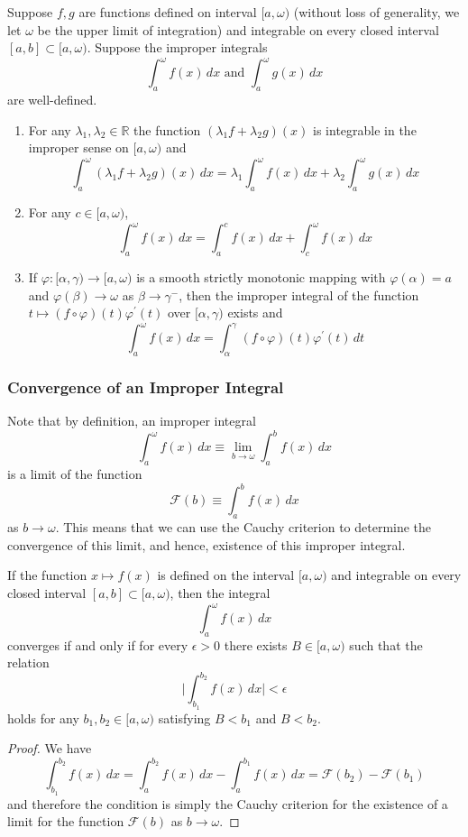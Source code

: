   \begin{lemma}
    Suppose $f, g$ are functions defined on interval $[a, \omega)$ (without loss of generality, we let $\omega$ be the upper limit of integration) and integrable on every closed interval $[a, b] \subset [a, \omega)$. Suppose the improper integrals 
    \[\int_a^\omega f(x)\,dx \text{ and } \int_a^\omega g(x)\,dx\]
    are well-defined. 
    \begin{enumerate}
      \item For any $\lambda_1, \lambda_2 \in \mathbb{R}$ the function $(\lambda_1 f + \lambda_2 g)(x)$ is integrable in the improper sense on $[a, \omega)$ and
      \[\int_a^\omega (\lambda_1 f + \lambda_2 g)(x)\,dx = \lambda_1 \int_a^\omega f(x)\,dx + \lambda_2 \int_a^\omega g(x)\,dx\]
      \item For any $c \in [a, \omega)$, 
      \[\int_a^\omega f(x)\,dx = \int_a^c f(x)\,dx + \int_c^\omega f(x)\,dx\]
      \item If $\varphi: [\alpha, \gamma) \longrightarrow [a, \omega)$ is a smooth strictly monotonic mapping with $\varphi(\alpha) = a$ and $\varphi(\beta) \rightarrow \omega$ as $\beta \rightarrow \gamma^-$, then the improper integral of the function $t \mapsto (f \circ \varphi)(t) \varphi^\prime (t)$ over $[\alpha, \gamma)$ exists and 
      \[\int_a^\omega f(x)\,dx = \int_\alpha^\gamma (f \circ \varphi)(t) \varphi^\prime (t)\,dt\]
    \end{enumerate}
  \end{lemma}

  \subsubsection{Convergence of an Improper Integral}

    Note that by definition, an improper integral 
    \[\int_a^\omega f(x)\,dx \equiv \lim_{b \rightarrow \omega} \int_a^b f(x) \,dx\]
    is a limit of the function 
    \[\mathcal{F}(b) \equiv \int_a^b f(x)\,dx\]
    as $b \rightarrow \omega$. This means that we can use the Cauchy criterion to determine the convergence of this limit, and hence, existence of this improper integral. 

    \begin{theorem}
    If the function $x \mapsto f(x)$ is defined on the interval $[a, \omega)$ and integrable on every closed interval $[a, b] \subset [a, \omega)$, then the integral 
    \[\int_a^\omega f(x)\,dx\]
    converges if and only if for every $\epsilon > 0$ there exists $B \in [a, \omega)$ such that the relation
    \[\Bigg| \int_{b_1}^{b_2} f(x)\,dx \bigg| < \epsilon\]
    holds for any $b_1, b_2 \in [a, \omega)$ satisfying $B < b_1$ and $B < b_2$. 
    \end{theorem}
    \begin{proof}
    We have
    \[\int_{b_1}^{b_2} f(x)\,dx = \int_a^{b_2} f(x)\,dx - \int_a^{b_1} f(x)\,dx = \mathcal{F}(b_2) - \mathcal{F}(b_1)\]
    and therefore the condition is simply the Cauchy criterion for the existence of a limit for the function $\mathcal{F}(b)$ as $b \rightarrow \omega$. 
    \end{proof}

